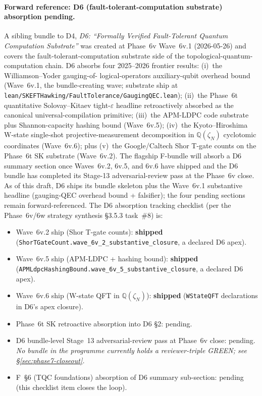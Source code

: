 \documentclass[aps,prd,reprint,nofootinbib,superscriptaddress]{revtex4-2}
\begin{document}
\paragraph{Forward reference: D6 (fault-tolerant-computation
substrate) absorption pending.}
A sibling bundle to D4, \emph{D6: ``Formally Verified Fault-Tolerant
Quantum Computation Substrate''} was created at Phase~6v Wave~6v.1
(2026-05-26) and covers the fault-tolerant-computation substrate
side of the topological-quantum-computation chain. D6 absorbs four
2025--2026 frontier results: (i)~the Williamson--Yoder gauging-of-
logical-operators auxiliary-qubit overhead bound (Wave~6v.1, the
bundle-creating wave; substrate ship at
\texttt{lean/SKEFTHawking/FaultTolerance/GaugingQEC.lean}); (ii)~the
Phase~6t quantitative Solovay--Kitaev tight-$\varepsilon$ headline
retroactively absorbed as the canonical universal-compilation
primitive; (iii)~the APM-LDPC code substrate plus Shannon-capacity
hashing bound (Wave~6v.5); (iv)~the Kyoto--Hiroshima W-state
single-shot projective-measurement decomposition in
$\mathbb{Q}(\zeta_N)$ cyclotomic coordinates (Wave~6v.6); plus
(v)~the Google/Caltech Shor T-gate counts on the Phase~6t SK
substrate (Wave~6v.2). The flagship F-bundle will absorb a D6
summary section once Waves~6v.2, 6v.5, and 6v.6 have shipped and the
D6 bundle has completed its Stage-13 adversarial-review pass at the
Phase~6v close. As of this draft, D6 ships its bundle skeleton plus
the Wave~6v.1 substantive headline (gauging-QEC overhead bound +
falsifier); the four pending sections remain forward-referenced.
The D6 absorption tracking checklist (per the Phase~6v/6w strategy
synthesis §3.5.3 task~\#8) is:
\begin{itemize}
\item[$\boxtimes$] Wave~6v.2 ship (Shor T-gate counts): \textbf{shipped}
  (\texttt{ShorTGateCount.wave\_6v\_2\_substantive\_closure}, a declared D6 apex).
\item[$\boxtimes$] Wave~6v.5 ship (APM-LDPC + hashing bound): \textbf{shipped}
  (\texttt{APMLdpcHashingBound.wave\_6v\_5\_substantive\_closure}, a declared D6 apex).
\item[$\boxtimes$] Wave~6v.6 ship (W-state QFT in $\mathbb{Q}(\zeta_N)$):
  \textbf{shipped} (\texttt{WStateQFT} declarations in D6's apex closure).
\item[$\Box$] Phase~6t SK retroactive absorption into D6 §2: pending.
\item[$\Box$] D6 bundle-level Stage~13 adversarial-review pass at
  Phase~6v close: pending. \emph{No bundle in the programme currently holds a
  reviewer-triple GREEN; see \S\ref{sec:phase7-closeout}.}
\item[$\Box$] F~§6 (TQC foundations) absorption of D6 summary
  sub-section: pending (this checklist item closes the loop).
\end{itemize}
\end{document}
